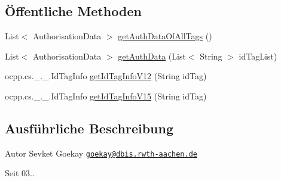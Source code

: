 \subsection*{Öffentliche Methoden}
\begin{DoxyCompactItemize}
\item 
List$<$ Authorisation\+Data $>$ \hyperlink{classde_1_1rwth_1_1idsg_1_1steve_1_1service_1_1_ocpp_tag_service_impl_a64dd6ead6ab37a9017c0484e9a7046f7}{get\+Auth\+Data\+Of\+All\+Tags} ()
\item 
List$<$ Authorisation\+Data $>$ \hyperlink{classde_1_1rwth_1_1idsg_1_1steve_1_1service_1_1_ocpp_tag_service_impl_ae69bf506adc092e4009d870827a2d4b2}{get\+Auth\+Data} (List$<$ String $>$ id\+Tag\+List)
\item 
ocpp.\+cs.\+\_.\+\_.\+Id\+Tag\+Info \hyperlink{classde_1_1rwth_1_1idsg_1_1steve_1_1service_1_1_ocpp_tag_service_impl_ac6bd54d80b55b59271fd42b73ff28f15}{get\+Id\+Tag\+Info\+V12} (String id\+Tag)
\item 
ocpp.\+cs.\+\_.\+\_.\+Id\+Tag\+Info \hyperlink{classde_1_1rwth_1_1idsg_1_1steve_1_1service_1_1_ocpp_tag_service_impl_a565bb2fa82522c27f3aba660b590ccce}{get\+Id\+Tag\+Info\+V15} (String id\+Tag)
\end{DoxyCompactItemize}


\subsection{Ausführliche Beschreibung}
\begin{DoxyAuthor}{Autor}
Sevket Goekay \href{mailto:goekay@dbis.rwth-aachen.de}{\tt goekay@dbis.\+rwth-\/aachen.\+de} 
\end{DoxyAuthor}
\begin{DoxySince}{Seit}
03.. 
\end{DoxySince}


